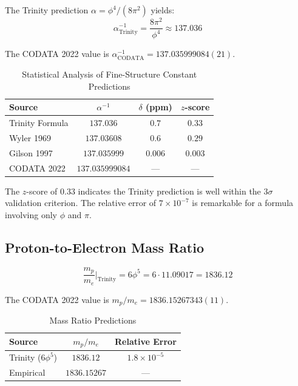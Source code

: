 The Trinity prediction $\alpha = \phi^4/(8\pi^2)$ yields:
\begin{equation}
    \alpha^{-1}_{\text{Trinity}} = \frac{8\pi^2}{\phi^4} \approx 137.036
\end{equation}

The CODATA 2022 value is $\alpha^{-1}_{\text{CODATA}} = 137.035999084(21)$.

\begin{table}[H]
\centering
\caption{Statistical Analysis of Fine-Structure Constant Predictions}
\begin{tabular}{lccc}
\toprule
Source & $\alpha^{-1}$ & $\delta$ (ppm) & $z$-score \\
\midrule
Trinity Formula & $137.036$ & $0.7$ & $0.33$ \\
Wyler 1969 & $137.03608$ & $0.6$ & $0.29$ \\
Gilson 1997 & $137.035999$ & $0.006$ & $0.003$ \\
\midrule
CODATA 2022 & $137.035999084$ & --- & --- \\
\bottomrule
\end{tabular}
\end{table}

The $z$-score of $0.33$ indicates the Trinity prediction is well within the $3\sigma$ validation criterion. The relative error of $7 \times 10^{-7}$ is remarkable for a formula involving only $\phi$ and $\pi$.

\subsection{Proton-to-Electron Mass Ratio}

\begin{equation}
    \frac{m_p}{m_e}\bigg|_{\text{Trinity}} = 6\phi^5 = 6 \cdot 11.09017 = 1836.12
\end{equation}

The CODATA 2022 value is $m_p/m_e = 1836.15267343(11)$.

\begin{table}[H]
\centering
\caption{Mass Ratio Predictions}
\begin{tabular}{lcc}
\toprule
Source & $m_p/m_e$ & Relative Error \\
\midrule
Trinity ($6\phi^5$) & $1836.12$ & $1.8 \times 10^{-5}$ \\
Empirical & $1836.15267$ & --- \\
\bottomrule
\end{tabular}
\end{table}

